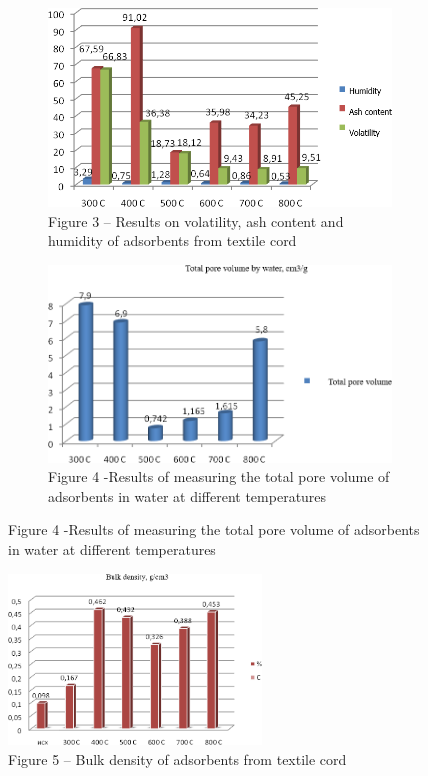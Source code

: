 \begin{figure}[H]
    \centering
    \begin{subfigure}[b]{0.45\textwidth}
        \centering
        \includegraphics[width=\textwidth]{assets/1006}
        \caption*{Figure 3 -- Results on volatility, ash content and humidity of adsorbents from textile cord}
    \end{subfigure}
    \hfill
    \begin{subfigure}[b]{0.45\textwidth}
        \centering
        \includegraphics[width=\textwidth]{assets/1007}
        \caption*{Figure 4 -Results of measuring the total pore volume of adsorbents in water at different temperatures}
    \end{subfigure}
\end{figure}

\begin{figure}[H]
	\centering
	\includegraphics[width=0.6\textwidth]{assets/1008}
	\caption*{Figure 5 -- Bulk density of adsorbents from textile cord}
\end{figure}

